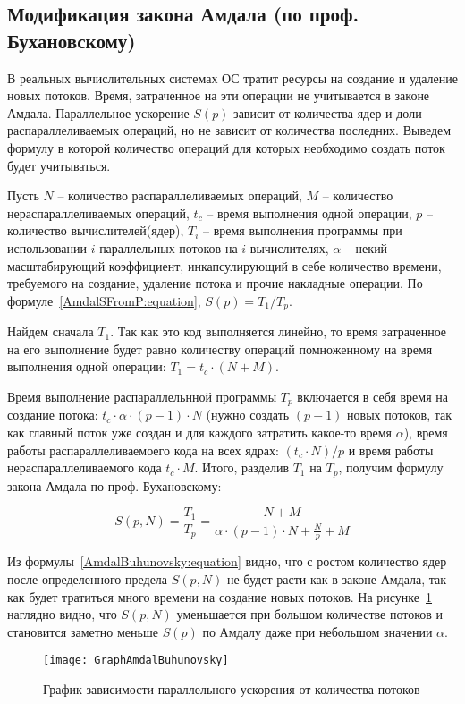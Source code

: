 \subsection{Модификация закона Амдала (по проф. Бухановскому)}

В реальных вычислительных системах ОС тратит ресурсы на создание и удаление новых потоков. Время, затраченное на эти операции не учитывается в законе Амдала. Параллельное ускорение $S(p)$ зависит от количества ядер и доли распараллеливаемых операций, но не зависит от количества последних. Выведем формулу в которой количество операций для которых необходимо создать поток будет учитываться.

Пусть $N$ -- количество распараллеливаемых операций, $M$ -- количество нераспараллеливаемых операций, $t_c$ -- время выполнения одной операции, $p$ -- количество вычислителей(ядер), $T_i$ -- время выполнения программы при использовании $i$ параллельных потоков на $i$ вычислителях, $\alpha$ -- некий масштабирующий коэффициент, инкапсулирующий в себе количество времени, требуемого на создание, удаление потока и прочие накладные операции. 
По формуле~\eqref{AmdalSFromP:equation}, $S(p) = {T_1} / {T_p}$.

Найдем сначала $T_1$. Так как это код выполняется линейно, то время затраченное на его выполнение будет равно количеству операций помноженному на время выполнения одной операции: $T_1 = t_c \cdot (N + M)$.

Время выполнение распараллельнной программы $T_p$ включается в себя время на создание потока: $t_c \cdot \alpha \cdot (p - 1) \cdot N$ (нужно создать $(p - 1)$ новых потоков, так как главный поток уже создан и для каждого затратить какое-то время $\alpha$), время работы распараллеливаемоего кода на всех ядрах: $(t_c \cdot N) / {p}$ и время работы нераспараллеливаемого кода $t_c \cdot M$. Итого, разделив $T_1$ на $T_p$, получим формулу закона Амдала по проф. Бухановскому:

\begin{equation}
    \label{AmdalBuhunovsky:equation}
    S(p,N) = \frac{T_1}{T_p} = \frac{N + M}{\alpha \cdot (p - 1) \cdot N + \displaystyle\frac{N}{p} + M}
\end{equation}

Из формулы~\eqref{AmdalBuhunovsky:equation} видно, что с ростом количество ядер после определенного предела $S(p,N)$  не будет расти как в законе Амдала, так как будет тратиться много времени на создание новых потоков. На рисунке~\ref{GraphAmdalBuhunovsky:image} наглядно видно, что $S(p,N)$ уменьшается при большом количестве потоков и становится заметно меньше $S(p)$ по Амдалу даже при небольшом значении $\alpha$.

\begin{figure}[H]
    \texttt{[image: GraphAmdalBuhunovsky]}
    \caption{График зависимости параллельного ускорения от количества потоков}
    \label{GraphAmdalBuhunovsky:image}
\end{figure}
